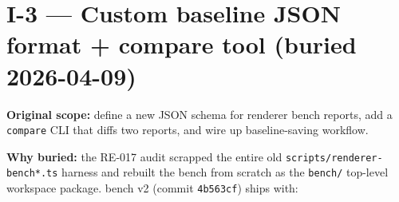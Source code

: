 \chapter{I-3 --- Custom baseline JSON format + compare tool (buried 2026-04-09)}\label{record-421}

\smallskip

\textbf{Original scope:} define a new JSON schema for renderer bench reports, add a \texttt{c\allowbreak{}o\allowbreak{}m\allowbreak{}p\allowbreak{}a\allowbreak{}r\allowbreak{}e} CLI that diffs two reports, and wire up baseline-saving workflow.

\textbf{Why buried:} the RE-017 audit scrapped the entire old \texttt{s\allowbreak{}c\allowbreak{}r\allowbreak{}i\allowbreak{}p\allowbreak{}t\allowbreak{}s\allowbreak{}/\allowbreak{}r\allowbreak{}e\allowbreak{}n\allowbreak{}d\allowbreak{}e\allowbreak{}r\allowbreak{}e\allowbreak{}r\allowbreak{}-\allowbreak{}b\allowbreak{}e\allowbreak{}n\allowbreak{}c\allowbreak{}h\allowbreak{}*\allowbreak{}.\allowbreak{}t\allowbreak{}s} harness and rebuilt the bench from scratch as the \texttt{b\allowbreak{}e\allowbreak{}n\allowbreak{}c\allowbreak{}h\allowbreak{}/} top-level workspace package. bench v2 (commit \texttt{4\allowbreak{}b\allowbreak{}5\allowbreak{}6\allowbreak{}3\allowbreak{}c\allowbreak{}f}) ships with:

